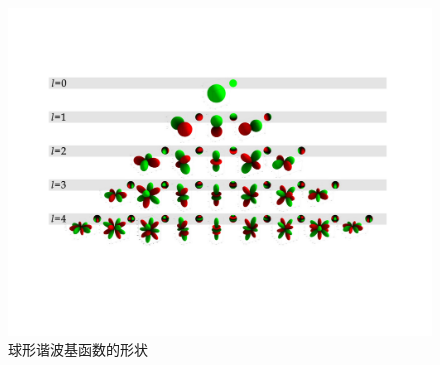 \begin{figure}[tbp]
    \centering
    \includegraphics[width=1.0\textwidth]{Img/sh-shape.pdf}

    \caption[球形谐波基函数的形状]{ 
        球形谐波基函数的形状
        \label{fig:sh-shape}
        \cite{green2003spherical}
    }
\end{figure}